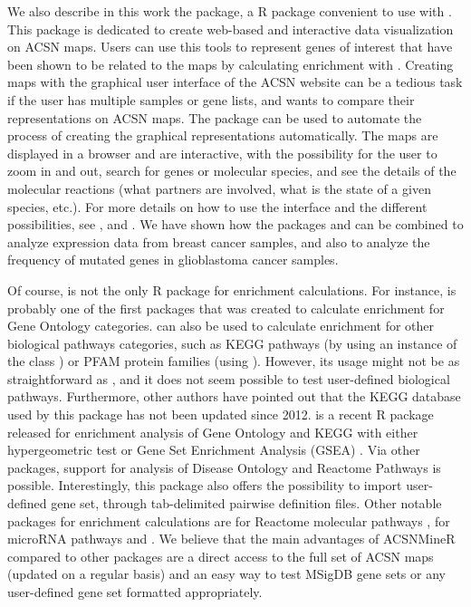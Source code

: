We also describe in this work the  package, a R package
convenient to use with . This package is dedicated to create
web-based and interactive data visualization on ACSN maps. Users can use this
tools to represent genes of interest that have been shown to be related to the
maps by calculating enrichment with .  Creating maps with the
graphical user interface of the ACSN website can be a tedious task if the user
has multiple samples or gene lists, and wants to compare their representations
on ACSN maps. The  package can be used to automate the process
of creating the graphical representations automatically.  The maps are
displayed in a browser and are interactive, with the possibility for the user
to zoom in and out, search for genes or molecular species, and see the details
of the molecular reactions (what partners are involved, what is the state of a
given species, etc.). For more details on how to use the interface and the
different possibilities, see \cite{kuperstein2013navicell},
\cite{bonnet2015navicell} and \cite{kuperstein2015atlas}. We have shown how the
packages  and  can be combined to analyze
expression data from breast cancer samples, and also to analyze the frequency
of mutated genes in glioblastoma cancer samples.  

Of course,  is not the only R package for enrichment
calculations. For instance,  \citep{falcon2007using} is
probably one of the first packages that was created to calculate enrichment for
Gene Ontology categories.   can also be used to calculate
enrichment for other biological pathways categories, such as KEGG pathways (by
using an instance of the class ) or PFAM protein
families (using ). However, its usage might not be as
straightforward as , and it does not seem possible to test
user-defined biological pathways. Furthermore, other authors have pointed out
that the KEGG database used by this package has not been updated since 2012.
 is a recent R package released for enrichment analysis
of Gene Ontology and KEGG with either hypergeometric test or Gene Set
Enrichment Analysis (GSEA) \citep{yu2012clusterprofiler}. Via other packages,
support for analysis of Disease Ontology and Reactome Pathways is possible.
Interestingly, this package also offers the possibility to import user-defined
gene set, through tab-delimited pairwise definition files. Other notable
packages for enrichment calculations are  for Reactome molecular
pathways \citep{ReactomePA2016},  for microRNA pathways
\citep{miRNApath2008} and  \citep{gage2009}. We believe that the main
advantages of ACSNMineR compared to other packages are a direct access to the
full set of ACSN maps (updated on a regular basis) and an easy way to test
MSigDB gene sets or any user-defined gene set formatted appropriately.

